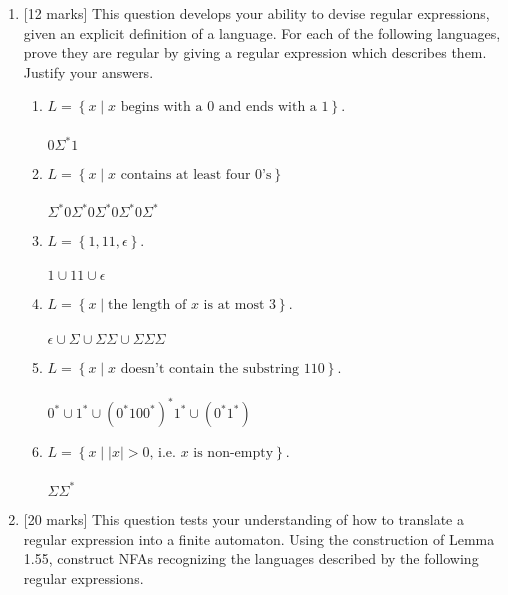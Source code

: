 \documentclass{article}
\newcommand{\set}[1]{{\left\{#1\right\}}}    %
\newcommand{\abs}[1]{\left\lvert #1 \right\rvert}
\begin{document}
\begin{enumerate}
    \item {[12 marks]} This question develops your ability to devise regular expressions, given an explicit definition of a language. For each of the following languages, prove they are regular by giving a regular expression which describes them. Justify your answers.
        \begin{enumerate}
            \item $L=\set{x\mid x \text{ begins with a $0$ and ends with a $1$}}$.\\
            \\
            $0\Sigma^*1$\\
            \item $L=\set{x\mid x \text{ contains at least four $0$'s}}$\\
            \\
            $\Sigma^*0\Sigma^*0\Sigma^*0\Sigma^*0\Sigma^*$\\
            \item $L=\set{1, 11, \epsilon}$.\\
            \\
            $1\cup11\cup\epsilon$\\
            \item $L=\set{x\mid \text{the length of $x$ is at most $3$}}$.\\
            \\
            $\epsilon \cup \Sigma \cup \Sigma\Sigma \cup \Sigma\Sigma\Sigma$\\
            \item $L=\set{x\mid x \text{ doesn't contain the substring $110$}}$.\\
            \\
            $0^* \cup 1^* \cup (0^*100^*)^*1^* \cup (0^*1^*)$
            \item $L=\set{x \mid \abs{x}>0 \text{, i.e. $x$ is non-empty}}$.\\
            \\
            $\Sigma\Sigma^*$\\
        \end{enumerate}
    \item {[20 marks]} This question tests your understanding of how to translate a regular expression into a finite automaton. Using the construction of Lemma 1.55, construct NFAs recognizing the languages described by the following regular expressions.
        \begin{enumerate}

\end{enumerate}
\end{enumerate}
\end{document}
